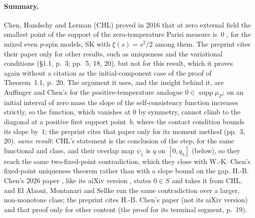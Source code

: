 \documentclass[11pt]{article}
\newcommand{\ploc}[2]{#1}
\newcommand{\sloc}[2]{\cite[#2]{#1}}
\newcommand{\rel}[1]{\textit{#1}}
\begin{document}
\paragraph{Summary.}
Chen, Handschy and Lerman (CHL) proved in 2016 that at zero external field
the smallest point of the support of the zero-temperature Parisi measure
is~$0$ \sloc{ChenEtAl2016-EnergyLandscapeMixedEvenPSpin}{\S3.2, p.~18}, for
the mixed even $p$-spin models, SK with $\xi(s)=s^2/2$ among them. The
preprint cites their paper only for other results, such as uniqueness and
the variational conditions (\ploc{\S1.1, p.~3}{main.tex:173--175, 207--211};
\ploc{pp.~5, 18, 20}{regularity.tex:9--11; variation.tex:8--10;
order-parameter-regularity.tex:10--11}), but not for this result, which it
proves again without a citation as the initial-component case of the
\ploc{proof of Theorem~1.1, p.~20}{variation.tex:239--242}.
The argument it uses, and the insight behind it, are Auffinger and Chen's
\sloc{AuffingerChen2013-PropertiesParisiMeasures}{proof of Thm~1(i), p.~15}
for the positive-temperature analogue $0\in\operatorname{supp}\mu_P$: on an
initial interval of zero mass the slope of the self-consistency function
increases strictly, so the function, which vanishes at $0$ by symmetry,
cannot climb to the diagonal at a positive first support point~$b$, where
the contact condition bounds its slope by~$1$; the preprint cites that paper
only for its moment method (\ploc{pp.~3, 20}{main.tex:215--218;
order-parameter-regularity.tex:7--9}).
\rel{same result}: CHL's statement is the conclusion of the step, for the
same functional and class, and their overlap map $\psi_1$ is $q$ on $[0,q_h]$ (below), so
they reach the same two-fixed-point contradiction, which they close with
W.-K. Chen's fixed-point uniqueness theorem \cite[Thm~5]{NL-Chen2014} rather
than with a slope bound on the gap.
H.-B. Chen's 2026 paper \sloc{Chen2026-FRSBFullIntervalSupportZeroTemp}{Prop.~3.2,
pp.~8--9}, like its aiXiv version
\sloc{ChatGPT2026-FRSBFullIntervalSupportZeroTemp}{p.~17}, states $0\in S$
and takes it from CHL, and El Alaoui, Montanari and Sellke
\sloc{ElAlaouiEtAl2020-OptimizationMeanFieldSpinGlasses}{proof of Thm~5,
pp.~30--31} run the same contradiction over a larger, non-monotone class;
the preprint cites H.-B. Chen's paper (not its aiXiv version) and that proof
only for other content (the proof for its terminal segment,
\ploc{p.~19}{variation.tex:140--143}).
\end{document}
